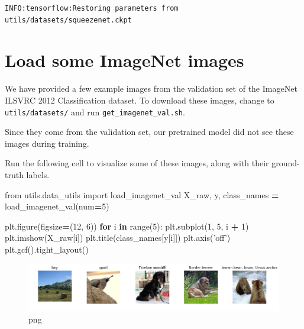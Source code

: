 \documentclass[]{book}
\newenvironment{Shaded}{\begin{snugshade}}{\end{snugshade}}
\newcommand{\KeywordTok}[1]{\textcolor[rgb]{0.13,0.29,0.53}{\textbf{#1}}}
\newcommand{\DecValTok}[1]{\textcolor[rgb]{0.00,0.00,0.81}{#1}}
\newcommand{\StringTok}[1]{\textcolor[rgb]{0.31,0.60,0.02}{#1}}
\newcommand{\ImportTok}[1]{#1}
\newcommand{\ControlFlowTok}[1]{\textcolor[rgb]{0.13,0.29,0.53}{\textbf{#1}}}
\newcommand{\OperatorTok}[1]{\textcolor[rgb]{0.81,0.36,0.00}{\textbf{#1}}}
\newcommand{\BuiltInTok}[1]{#1}
\newcommand{\NormalTok}[1]{#1}
\theoremstyle{definition}
\theoremstyle{definition}
\theoremstyle{definition}
\theoremstyle{remark}
\begin{document}
\begin{verbatim}
INFO:tensorflow:Restoring parameters from utils/datasets/squeezenet.ckpt
\end{verbatim}

\section{Load some ImageNet images}\label{load-some-imagenet-images}

We have provided a few example images from the validation set of the
ImageNet ILSVRC 2012 Classification dataset. To download these images,
change to \texttt{utils/datasets/} and run
\texttt{get\_imagenet\_val.sh}.

Since they come from the validation set, our pretrained model did not
see these images during training.

Run the following cell to visualize some of these images, along with
their ground-truth labels.

\begin{Shaded}
\begin{Highlighting}[]
\ImportTok{from}\NormalTok{ utils.data_utils }\ImportTok{import}\NormalTok{ load_imagenet_val}
\NormalTok{X_raw, y, class_names }\OperatorTok{=}\NormalTok{ load_imagenet_val(num}\OperatorTok{=}\DecValTok{5}\NormalTok{)}

\NormalTok{plt.figure(figsize}\OperatorTok{=}\NormalTok{(}\DecValTok{12}\NormalTok{, }\DecValTok{6}\NormalTok{))}
\ControlFlowTok{for}\NormalTok{ i }\KeywordTok{in} \BuiltInTok{range}\NormalTok{(}\DecValTok{5}\NormalTok{):}
\NormalTok{    plt.subplot(}\DecValTok{1}\NormalTok{, }\DecValTok{5}\NormalTok{, i }\OperatorTok{+} \DecValTok{1}\NormalTok{)}
\NormalTok{    plt.imshow(X_raw[i])}
\NormalTok{    plt.title(class_names[y[i]])}
\NormalTok{    plt.axis(}\StringTok{'off'}\NormalTok{)}
\NormalTok{plt.gcf().tight_layout()}
\end{Highlighting}
\end{Shaded}

\begin{figure}
\centering
\includegraphics{Network-Visualization-TensorFlow_files/Network-Visualization-TensorFlow_7_0.png}
\caption{png}
\end{figure}
\end{document}
